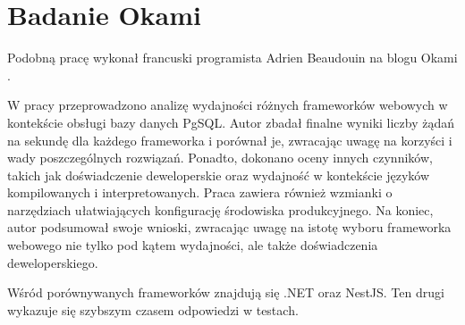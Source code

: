 \section{Badanie Okami}
Podobną pracę wykonał francuski programista Adrien Beaudouin na blogu Okami \cite{okami1012024Benchmark}.

W pracy przeprowadzono analizę wydajności różnych frameworków webowych w kontekście obsługi bazy danych PgSQL.
Autor zbadał finalne wyniki liczby żądań na sekundę dla każdego frameworka i porównał je, zwracając uwagę na korzyści i wady poszczególnych rozwiązań. 
Ponadto, dokonano oceny innych czynników, takich jak doświadczenie deweloperskie oraz wydajność w kontekście języków kompilowanych i interpretowanych.
Praca zawiera również wzmianki o narzędziach ułatwiających konfigurację środowiska produkcyjnego.
Na koniec, autor podsumował swoje wnioski, zwracając uwagę na istotę wyboru frameworka webowego nie tylko pod kątem wydajności, ale także doświadczenia deweloperskiego.

Wśród porównywanych frameworków znajdują się .NET oraz NestJS.
Ten drugi wykazuje się szybszym czasem odpowiedzi w testach.